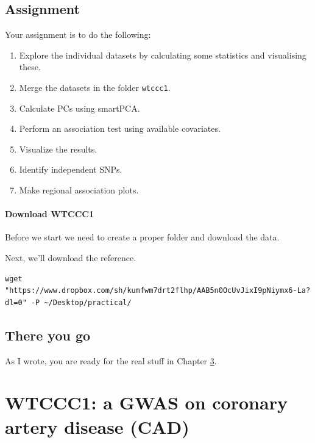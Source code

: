 \documentclass[
]{book}
\providecommand{\tightlist}{%
  \setlength{\itemsep}{0pt}\setlength{\parskip}{0pt}}
\begin{document}
\hypertarget{assignment}{%
\section{Assignment}\label{assignment}}

Your assignment is to do the following:

\begin{enumerate}
\def\labelenumi{\arabic{enumi}.}
\tightlist
\item
  Explore the individual datasets by calculating some statistics and visualising these.
\item
  Merge the datasets in the folder \texttt{wtccc1}.
\item
  Calculate PCs using smartPCA.
\item
  Perform an association test using available covariates.
\item
  Visualize the results.
\item
  Identify independent SNPs.
\item
  Make regional association plots.
\end{enumerate}

\hypertarget{download-wtccc1}{%
\subsubsection{Download WTCCC1}\label{download-wtccc1}}

Before we start we need to create a proper folder and download the data.

Next, we'll download the reference.

\begin{verbatim}
wget "https://www.dropbox.com/sh/kumfwm7drt2flhp/AAB5n0OcUvJixI9pNiymx6-La?dl=0" -P ~/Desktop/practical/
\end{verbatim}

\hypertarget{there-you-go}{%
\section{There you go}\label{there-you-go}}

As I wrote, you are ready for the real stuff in Chapter \ref{wtccc1}.

\hypertarget{wtccc1}{%
\chapter{WTCCC1: a GWAS on coronary artery disease (CAD)}\label{wtccc1}}
\end{document}
